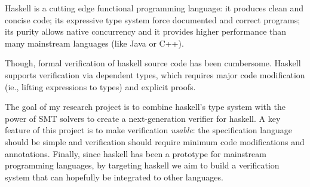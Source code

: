 Haskell is a cutting edge functional programming language:
it produces clean and concise code;
its expressive type system force documented and correct programs; 
its purity allows native concurrency and 
it provides higher performance than many mainstream languages (like Java or C++). 


Though, formal verification of haskell source code has been cumbersome.
Haskell supports verification via dependent types, which requires  
major code modification (ie., lifting expressions to types)
and explicit proofs.
%

The goal of my research project is to combine haskell's type system with 
the power of SMT solvers to 
create a next-generation verifier for haskell.
%
A key feature of this project is to make verification \textit{usable}:
the specification language should be simple and 
verification should require minimum code modifications and annotations. 
%
Finally, since haskell has been a prototype for mainstream programming languages,
by targeting haskell we aim to build a verification system that can hopefully be integrated to other languages.
